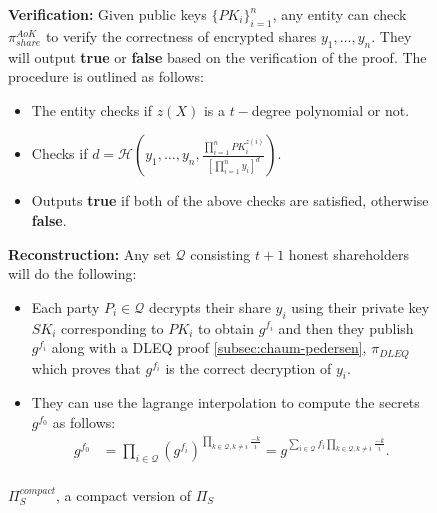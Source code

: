 \begin{figure}[ht]
{\begin{tcolorbox}[title=$\Pi_{S}^{compact}$, width=1.2\textwidth, colframe=blue!75!black, colback=blue!10, sharp corners]
        \vspace{0.5em}
        \textbf{Verification:}
            Given public keys $\{PK_i\}_{i=1}^n$, any entity can check 
            $\pi_{share}^{AoK}$ to verify the correctness of encrypted shares $y_1,\dots,y_n$. 
            They will output \textbf{true} or \textbf{false} based on the verification of the proof. The 
            procedure is outlined as follows:
        \begin{itemize}
            \item The entity checks if $z(X)$ is a $t-$degree polynomial or not.
            \item Checks if $d=\mathcal{H}(y_1,\dots,y_n,\frac{\prod_{i=1}^{n}PK_i^{z(i)}}{[\prod_{i=1}^n y_i]^d})$.
            \item Outputs \textbf{true} if both of the above checks are satisfied, otherwise \textbf{false}.
        \end{itemize}

        \vspace{0.5em}
        \textbf{Reconstruction:}
            Any set $\mathcal{Q}$ consisting $t+1$ honest shareholders will do the following:
            \begin{itemize}
                \item Each party $P_i\in\mathcal{Q}$ decrypts their share $y_i$ using their private key $SK_i$ 
                    corresponding to $PK_i$ to obtain $g^{f_i}$ and then they publish $g^{f_i}$ 
                    along with a DLEQ proof \ref{subsec:chaum-pedersen}, $\pi_{DLEQ}$ which proves that 
                    $g^{f_i}$ is the correct decryption of $y_i$.
                \item They can use the 
                lagrange interpolation to compute the secrets $g^{f_0}$ as follows:
                \begin{align*}
                    g^{f_0} &= \prod_{i\in\mathcal{Q}}(g^{f_i})^{\prod_{k\in\mathcal{Q},k\neq i}\frac{-k}{i}}= g^{\sum_{i\in\mathcal{Q}}f_i\prod_{k\in\mathcal{Q},k\neq i}\frac{-k}{i}}.\\
                \end{align*}
            \end{itemize}
    \end{tcolorbox}
    }
    \caption[PVSS]{$\Pi_{S}^{compact}$, a compact version of $\Pi_{S}$}
    \label{fig:compact-PVSS-ro}
\end{figure}
